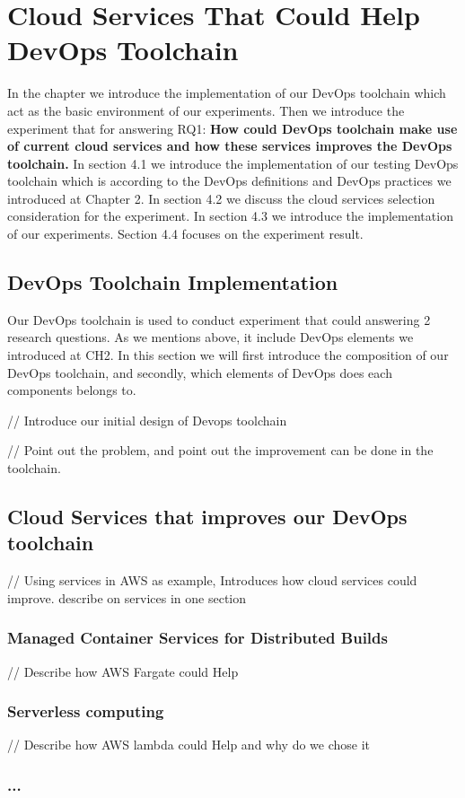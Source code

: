 \chapter{Cloud Services That Could Help DevOps Toolchain}
In the chapter we introduce the implementation of our DevOps toolchain which act as the basic environment of our experiments. Then we introduce the experiment that for answering RQ1: \textbf{How could DevOps toolchain make use of current cloud services and how these services improves the DevOps toolchain.} In section 4.1 we introduce the implementation of our testing DevOps toolchain which is according to the DevOps definitions and DevOps practices we introduced at Chapter 2. In section 4.2 we discuss the cloud services selection consideration for the experiment. In section 4.3 we introduce the implementation of our experiments. Section 4.4 focuses on the experiment result.
\section{DevOps Toolchain Implementation}
Our DevOps toolchain is used to conduct experiment that could answering 2 research questions. As we mentions above, it include DevOps elements we introduced at CH2. In this section we will first introduce the composition of our DevOps toolchain, and secondly, which elements of DevOps does each components belongs to.

// Introduce our initial design of Devops toolchain

// Point out the problem, and point out the improvement can be done in the toolchain.

\section{Cloud Services that improves our DevOps toolchain}
\label{assumption}
//  Using services in AWS as example, Introduces how cloud services could improve. describe on services in one section
\subsection{Managed Container Services for Distributed Builds} 
// Describe how AWS Fargate could Help
\subsection{Serverless computing}
// Describe how AWS lambda could Help and why do we chose it
\subsection{...}
